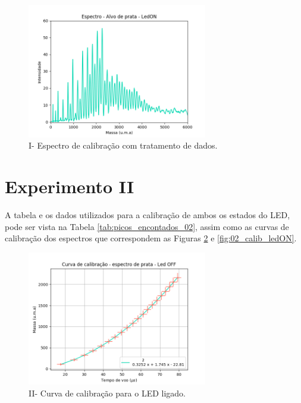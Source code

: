 \begin{figure}
  \centering  
  \includegraphics[width=0.7\textwidth]{exp_01/LEDON_espec_calib_ag_massa.png}
  \caption{I- Espectro de calibração com tratamento de dados.}
  \label{fig:01_ledon_massa} 
\end{figure}


\section{Experimento II}
A tabela e os dados utilizados para a calibração de ambos os estados do LED, pode ser vista na Tabela \ref{tab:picos_encontados_02}, assim como as curvas de calibração dos espectros que correspondem as Figuras \ref{fig:02_calib_ledOFF} e \ref{fig:02_calib_ledON}.

\begin{figure}
  \centering  
  \includegraphics[width=0.7\textwidth]{exp_02/LEDOFF_curv+erro_calib.png}
  \caption{II- Curva de calibração para o LED ligado.}
  \label{fig:02_calib_ledOFF} 
\end{figure}

